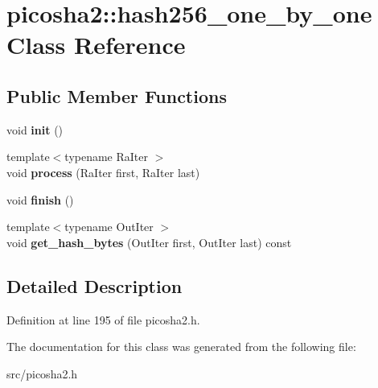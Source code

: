 \hypertarget{classpicosha2_1_1hash256__one__by__one}{}\section{picosha2\+:\+:hash256\+\_\+one\+\_\+by\+\_\+one Class Reference}
\label{classpicosha2_1_1hash256__one__by__one}
\subsection*{Public Member Functions}
\begin{DoxyCompactItemize}
\item 
void {\bfseries init} ()\hypertarget{classpicosha2_1_1hash256__one__by__one_a9308a2f22f9d0afbd315c9cf45458819}{}\label{classpicosha2_1_1hash256__one__by__one_a9308a2f22f9d0afbd315c9cf45458819}

\item 
{\footnotesize template$<$typename Ra\+Iter $>$ }\\void {\bfseries process} (Ra\+Iter first, Ra\+Iter last)\hypertarget{classpicosha2_1_1hash256__one__by__one_a2ce5fc541a7c27a935eecb85b9dd6497}{}\label{classpicosha2_1_1hash256__one__by__one_a2ce5fc541a7c27a935eecb85b9dd6497}

\item 
void {\bfseries finish} ()\hypertarget{classpicosha2_1_1hash256__one__by__one_a1c2c4d24deccb590cbbd30ffeb317690}{}\label{classpicosha2_1_1hash256__one__by__one_a1c2c4d24deccb590cbbd30ffeb317690}

\item 
{\footnotesize template$<$typename Out\+Iter $>$ }\\void {\bfseries get\+\_\+hash\+\_\+bytes} (Out\+Iter first, Out\+Iter last) const \hypertarget{classpicosha2_1_1hash256__one__by__one_a8bde4f61382a83ba52b9c2ec197324e4}{}\label{classpicosha2_1_1hash256__one__by__one_a8bde4f61382a83ba52b9c2ec197324e4}

\end{DoxyCompactItemize}


\subsection{Detailed Description}


Definition at line 195 of file picosha2.\+h.



The documentation for this class was generated from the following file\+:\begin{DoxyCompactItemize}
\item 
src/picosha2.\+h\end{DoxyCompactItemize}
